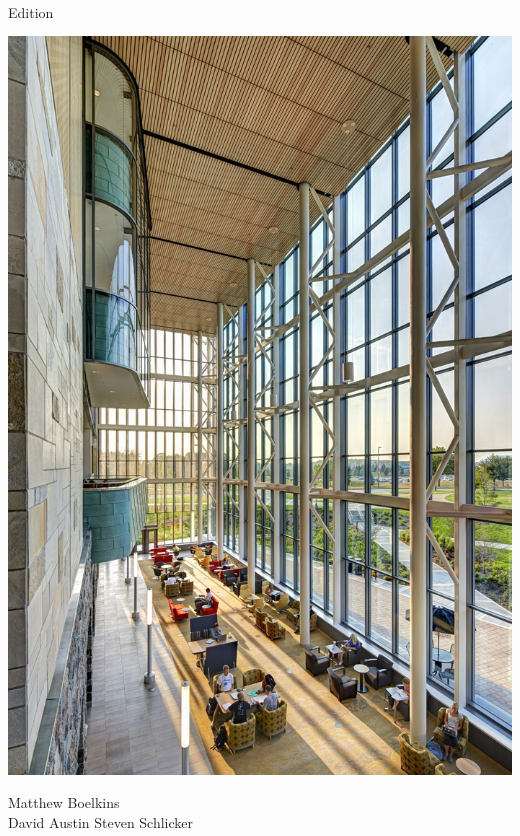 \documentclass{article}
\begin{document}
\color{covergreen}
\begin{center}
\fontsize{32pt}{48pt}\selectfont{} \\[8pt]
\fontsize{12pt}{14pt} Edition\\[10pt]
\end{center}
\begin{center}
\includegraphics[scale=.8]{ActiveCalculusCover.jpg}
\end{center}
\begin{center}
\fontsize{24pt}{32pt}\selectfont Matthew Boelkins\\
\fontsize{18pt}{24pt}\selectfont David Austin \quad Steven Schlicker
\end{center}
\end{document}
